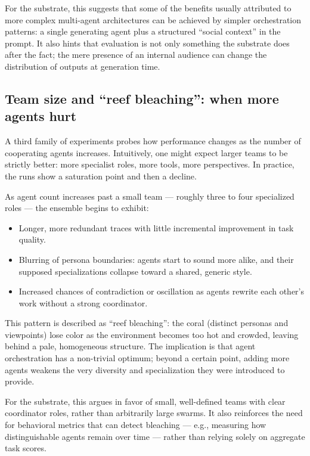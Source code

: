 For the substrate, this suggests that some of the benefits usually
attributed to more complex multi-agent architectures can be achieved by
simpler orchestration patterns: a single generating agent plus a
structured ``social context'' in the prompt. It also hints that
evaluation is not only something the substrate does after the fact; the
mere presence of an internal audience can change the distribution of
outputs at generation time.

\subsection{Team size and ``reef bleaching'': when more agents
hurt}\label{team-size-and-reef-bleaching-when-more-agents-hurt}

A third family of experiments probes how performance changes as the
number of cooperating agents increases. Intuitively, one might expect
larger teams to be strictly better: more specialist roles, more tools,
more perspectives. In practice, the runs show a saturation point and
then a decline.

As agent count increases past a small team --- roughly three to four
specialized roles --- the ensemble begins to exhibit:

\begin{itemize}
\tightlist
\item
  Longer, more redundant traces with little incremental improvement in
  task quality.
\item
  Blurring of persona boundaries: agents start to sound more alike, and
  their supposed specializations collapse toward a shared, generic
  style.
\item
  Increased chances of contradiction or oscillation as agents rewrite
  each other's work without a strong coordinator.
\end{itemize}

This pattern is described as ``reef bleaching'': the coral (distinct
personas and viewpoints) lose color as the environment becomes too hot
and crowded, leaving behind a pale, homogeneous structure. The
implication is that agent orchestration has a non-trivial optimum;
beyond a certain point, adding more agents weakens the very diversity
and specialization they were introduced to provide.

For the substrate, this argues in favor of small, well-defined teams
with clear coordinator roles, rather than arbitrarily large swarms. It
also reinforces the need for behavioral metrics that can detect
bleaching --- e.g., measuring how distinguishable agents remain over
time --- rather than relying solely on aggregate task scores.

